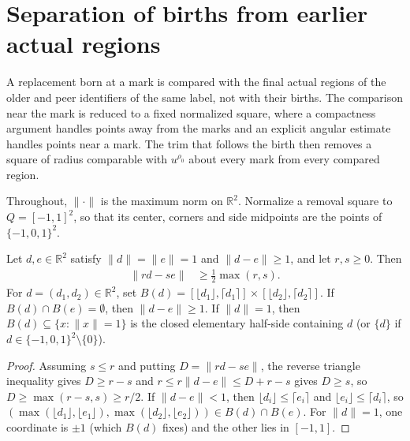 \section{Separation of births from earlier actual regions}
\label{sec:area_law_birth_separation}

A replacement born at a mark is compared with the final actual regions of
the older and peer identifiers of the same label, not with their births. The
comparison near the mark is reduced to a fixed normalized square, where a
compactness argument handles points away from the marks and an explicit
angular estimate handles points near a mark. The trim that follows the birth
then removes a square of radius comparable with $u^{\rho_0}$ about every mark
from every compared region.

Throughout, $\|\cdot\|$ is the maximum norm on $\mathbb R^2$. Normalize a
removal square to $Q=[-1,1]^2$, so that its center, corners and side
midpoints are the points of $\{-1,0,1\}^2$.

\begin{lemma}
    \label{thm:area_law_sup_angular_estimate}
    \leanok
    Let $d,e\in\mathbb R^2$ satisfy $\|d\|=\|e\|=1$ and $\|d-e\|\ge1$, and let $r,s\ge0$. Then
    \begin{align}
        \|rd-se\| & \ge\tfrac12\max(r,s).
        \label{eq:area_law_sup_angular_estimate}
    \end{align}
    For $d=(d_1,d_2)\in\mathbb R^2$, set $B(d)=[\lfloor d_1\rfloor,\lceil d_1\rceil]\times[\lfloor d_2\rfloor,\lceil d_2\rceil]$.
    If $B(d)\cap B(e)=\emptyset$, then $\|d-e\|\ge1$. If $\|d\|=1$, then $B(d)\subseteq\{x:\|x\|=1\}$
    is the closed elementary half-side containing $d$ (or $\{d\}$ if $d\in\{-1,0,1\}^2\setminus\{0\}$).
\end{lemma}

\begin{proof}
    \leanok
    Assuming $s\le r$ and putting $D=\|rd-se\|$, the reverse triangle inequality gives
    $D\ge r-s$ and $r\le r\|d-e\|\le D+r-s$ gives $D\ge s$, so $D\ge\max(r-s,s)\ge r/2$.
    If $\|d-e\|<1$, then $\lfloor d_i\rfloor\le\lceil e_i\rceil$ and $\lfloor e_i\rfloor\le\lceil d_i\rceil$,
    so $(\max(\lfloor d_1\rfloor,\lfloor e_1\rfloor),\max(\lfloor d_2\rfloor,\lfloor e_2\rfloor))\in B(d)\cap B(e)$.
    For $\|d\|=1$, one coordinate is $\pm1$ (which $B(d)$ fixes) and the other lies in $[-1,1]$.
\end{proof}

